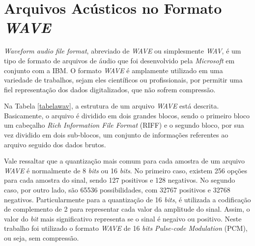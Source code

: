 \documentclass[a4paper,12pt,twoside,openright]{report}
\begin{document}
\section{Arquivos Ac\'{u}sticos no Formato \textit{WAVE}}
\label{secao_formato wave}
\par\textit{Waveform audio file format}, abreviado de \textit{WAVE} ou simplesmente \textit{WAV}, \'{e} um tipo de formato de arquivos de \'{a}udio que foi desenvolvido pela \textit{Microsoft} em conjunto com a IBM. O formato \textit{WAVE} \'{e} amplamente utilizado em uma variedade de trabalhos, sejam eles cient\'{i}ficos ou profissionais, por permitir uma fiel representa\c{c}\~{a}o dos dados digitalizados, que n\~{a}o sofrem compress\~{a}o. \\
\par Na Tabela \ref{tabelawav}, a estrutura de um arquivo \textit{WAVE} est\'{a} descrita. Basicamente, o arquivo \'{e} dividido em dois grandes blocos, sendo o primeiro bloco um cabe{\c c}alho \textit{Rich Information File Format} (RIFF) e o segundo bloco, por sua vez dividido em dois sub-blocos, um conjunto de informa\c{c}\~{o}es referentes ao arquivo seguido dos dados brutos.
\\
\par Vale ressaltar que a quantiza\c{c}\~{a}o mais comum para cada amostra de um  arquivo \textit{WAVE} \'{e} normalmente de 8 \textit{bits} ou 16 \textit{bits}. No primeiro caso, existem 256 op\c{c}\~{o}es para cada amostra do sinal, sendo 127 positivos e 128 negativos. No segundo caso, por outro lado, s\~{a}o 65536 possibilidades, com 32767 positivos e 32768 negativos. Particularmente para a quantiza\c{c}\~{a}o de 16 \textit{bits}, \'{e} utilizada a codifica{\c c}\~{a}o de complemento de 2 para representar cada valor da amplitude do sinal. Assim, o valor do \textit{bit} mais significativo representa se o sinal \'{e} negaivo ou positivo. Neste trabalho foi utilizado o formato \textit{WAVE} de 16 \textit{bits} \textit{Pulse-code Modulation} (PCM), ou seja, sem compress\~{a}o. 
\end{document}
